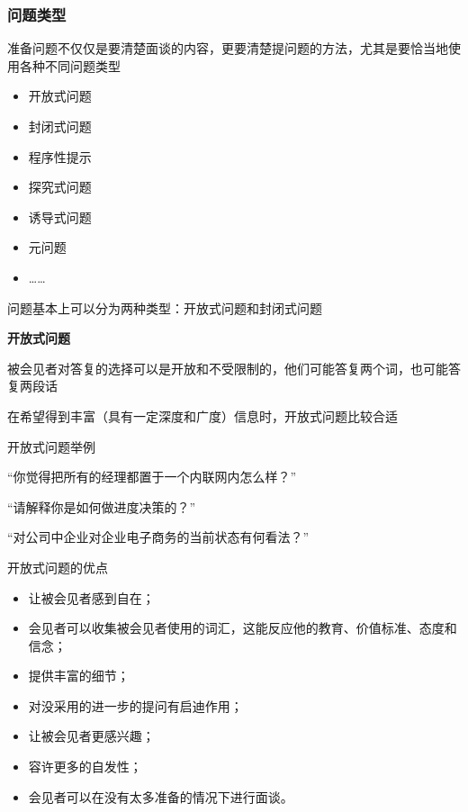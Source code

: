 \subsubsection{问题类型}
准备问题不仅仅是要清楚面谈的内容，更要清楚提问题的方法，尤其是要恰当地使用各种不同问题类型
\vspace{-0.8em}
\begin{multicols}{4}
    \begin{itemize}
        \item 开放式问题
        \item 封闭式问题
        \item 程序性提示 
        \item 探究式问题
        \item 诱导式问题
        \item 元问题
        \item ……
    \end{itemize}
\end{multicols}
\vspace{-1em}

问题基本上可以分为两种类型：开放式问题和封闭式问题

\textbf{开放式问题} \par
被会见者对答复的选择可以是开放和不受限制的，他们可能答复两个词，也可能答复两段话

在希望得到丰富（具有一定深度和广度）信息时，开放式问题比较合适

开放式问题举例
\vspace{-0.25em}
{\kaishu \begin{compactitem}
    \item “你觉得把所有的经理都置于一个内联网内怎么样？”
    \item “请解释你是如何做进度决策的？”
    \item “对公司中企业对企业电子商务的当前状态有何看法？”
\end{compactitem}}

开放式问题的优点
\begin{itemize}
    \item 让被会见者感到自在；
    \item 会见者可以收集被会见者使用的词汇，这能反应他的教育、价值标准、态度和信念；
    \item 提供丰富的细节；
    \item 对没采用的进一步的提问有启迪作用；
    \item 让被会见者更感兴趣；
    \item 容许更多的自发性；
    \item 会见者可以在没有太多准备的情况下进行面谈。
\end{itemize}

